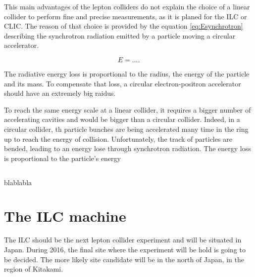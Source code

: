     This main advantages of the lepton colliders do not explain the choice of a linear collider to perform fine and precise measurements, as it is planed for the ILC or CLIC.
    The reason of that choice is provided by the equation \ref{eq:Esynchrotron} describing the synchrotron radiation emitted by a particle moving a circular accelerator.
    
    \begin{equation}
     E = ....
       \label{eq:Esynchrotron}
    \end{equation} 

    The radiative energy loss is proportional to the radius, the energy of the particle and its mass.
    To compensate that loss, a circular electron-positron accelerator should have an extremely big raidus. 



    To reach the same energy scale at a linear collider, it requires a bigger number of accelerating cavities and would be bigger than a circular collider.
    Indeed, in a circular collider, th particle bunches are being accelerated many time in the ring up to reach the energy of collision.
    Unfortunately, the track of particles are bended, leading to an energy lose through synchrotron radiation.
    The energy loss is proportional to the particle's energy
    

    
    \subsection{ }
  
  blablabla

  \section{The ILC machine}
  
    The ILC should be the next lepton collider experiment and will be situated in Japan.
    During 2016, the final site where the experiment will be hold is going to be decided.
    The more likely site candidate will be in the north of Japan, in the region of Kitakami. 
    
